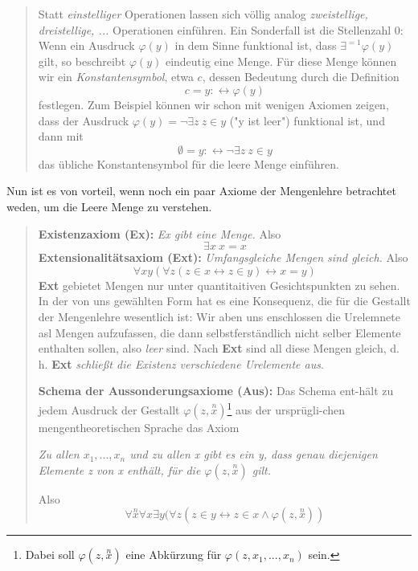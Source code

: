 \documentclass[11pt, a4paper]{article}
\begin{document}
\begin{quote}
    Statt \textit{einstelliger} Operationen lassen sich völlig analog
    \textit{zweistellige, dreistellige, ...} Operationen einführen. Ein
    Sonderfall ist die Stellenzahl 0: Wenn ein Ausdruck $\varphi(y)$ in dem
    Sinne funktional ist, dass $\exists^{=1}\varphi(y)$ gilt, so beschreibt
    $\varphi(y)$ eindeutig eine Menge. Für diese Menge können wir ein
    \textit{Konstantensymbol}, etwa $c$, dessen Bedeutung durch die Definition
    \[
        c = y :\leftrightarrow \varphi(y)
    \]
    festlegen. Zum Beispiel können wir schon mit wenigen Axiomen zeigen, dass
    der Ausdruck $\varphi(y)=\neg\exists z~z\in y$ ("y ist leer") funktional
    ist, und dann mit
    \[
        \emptyset = y :\leftrightarrow \neg\exists z~z\in y
    \]
    das übliche Konstantensymbol für die leere Menge einführen.
\end{quote}
Nun ist es von vorteil, wenn noch ein paar Axiome der Mengenlehre betrachtet
weden, um die Leere Menge zu verstehen.

\begin{quote}
\textbf{Existenzaxiom (Ex):}
\textit{Ex gibt eine Menge.}
Also
\[
    \exists x~x=x
\]
\textbf{Extensionalitätsaxiom (Ext):}
\textit{Umfangsgleiche Mengen sind gleich.}
Also
\[
    \forall xy(\forall z(z\in x \leftrightarrow z\in y) \leftrightarrow x=y)
\]
\textbf{Ext} gebietet Mengen nur unter quantitaitiven Gesichtspunkten zu sehen.
In der von uns gewählten Form hat es eine Konsequenz, die für die Gestallt der
Mengenlehre wesentlich ist: Wir aben uns enschlossen die Urelemnete asl Mengen
aufzufassen, die dann selbstferständlich nicht selber Elemente enthalten sollen,
also \textit{leer} sind. Nach \textbf{Ext} sind all diese Mengen gleich, d. h.
\textbf{Ext} \textit{schließt die Existenz verschiedene Urelemente aus}.

\textbf{Schema der Aussonderungsaxiome (Aus):}
Das Schema ent-hält zu jedem Ausdruck der Gestallt $\varphi(z,
\overset{n}{x})$\footnote{Dabei soll $\varphi(z, \overset{n}{x})$ eine
Abkürzung für $\varphi(z,x_1, ..., x_n)$ sein.} aus der ursprügli-chen
mengentheoretischen Sprache das Axiom

\textit{Zu allen $x_1, ..., x_n$ und zu allen x gibt es ein y, dass genau
diejenigen Elemente z von x enthält, für die $\varphi(z, \overset{n}{x})$ gilt.} 

Also
\[
    \forall\overset{n}{x}\forall x\exists y(\forall z(z\in y \leftrightarrow z\in
    x\land \varphi(z, \overset{n}{x}))
\]
\end{quote}
\end{document}

